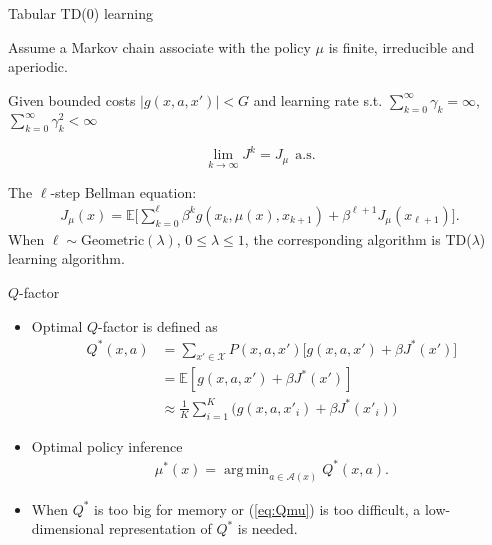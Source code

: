 \documentclass{beamer}
\def\X{{\mathcal X}}
\def\E{{\mathbb E}}
\DeclareMathOperator*{\argmin}{arg\,min}
\begin{document}
\begin{frame}{Tabular TD(0) learning}
\begin{theorem}[Sutton, 1988]
Assume a Markov chain associate with the policy $\mu$ is finite, irreducible and aperiodic.

 Given bounded costs $|g(x, a, x')|<G$ and learning rate s.t.
 $\sum\limits_{k=0}^\infty \gamma_k = \infty$, $\sum\limits_{k=0}^\infty \gamma_k^2 < \infty$


$$
\lim\limits_{k\rightarrow \infty} J^k = J_\mu~~\text{a.s.}
$$



\end{theorem}

\noindent The $\ell$-step Bellman equation:
\begin{align*}
J_\mu(x)= \E\Big[\sum_{k=0}^\ell \beta^k g(x_k, \mu(x), x_{k+1}) + \beta^{\ell+1} J_{\mu}(x_{\ell+1})\Big].
\end{align*}
When $\ell\sim \text{Geometric}(\lambda)$, $0\le \lambda \le 1$, the
corresponding algorithm is TD($\lambda$) learning algorithm.

\end{frame}


\begin{frame}{$Q$-factor}

  \begin{itemize}
      \item Optimal $Q$-factor is  defined as
        \begin{align*}
          Q^*(x, a) & = \sum\limits_{x' \in \X} P(x, a, x')\Big[g(x, a, x')+\beta J^*(x') \Big] \\
                    & = \E[g(x,a, x') + \beta  J^*(x')] \\
                    & \approx \frac{1}{K} \sum_{i=1}^K \Big(g(x, a, x'_i)+ \beta J^*(x'_i)\Big)
        \end{align*}

      \item Optimal policy inference
        \begin{align}\label{eq:Qmu}
          \mu^*(x) = \argmin_{a\in \mathcal{A}(x)} Q^*(x,a).
        \end{align}
      \item When $Q^*$ is too big for  memory or
        (\ref{eq:Qmu}) is too difficult, a
        low-dimensional representation of $Q^*$ is needed.

\end{itemize}

\end{frame}
\end{document}
